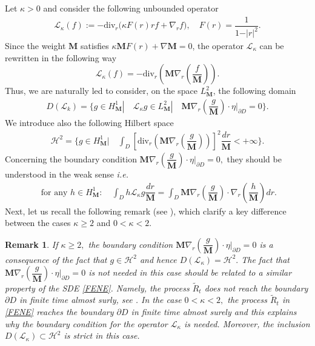 \documentclass[a4paper,12pt, reqno]{amsart}
\newtheorem{remark}[theorem]{Remark}
\newcommand{\M}{\mathbf{M}}
\renewcommand{\k}{\kappa}
\newcommand{\Div}{\text{div}}
\begin{document}
Let $\kappa>0$ and consider the following unbounded operator 
\begin{align}\label{operator-L}
   \mathcal{L}_\kappa(f):= -\Div_r \big(\kappa F(r) rf+	\nabla_r f\big), \quad F(r)=\dfrac{1 }{1-\vert r\vert^2}.
\end{align}
Since the weight $\M$ satisfies $\k \M F(r) + \nabla\M=0 $, the operator $\mathcal{L}_\k$ can be rewritten in the following way
$$\mathcal{L}_\k(f)=-\Div_r\left(\mathbf{M}\nabla_r\left(\dfrac{f}{\mathbf{M}}\right)\right).$$
Thus, we are naturally led to consider, on the space $L^2_\mathbf{M}$, the following domain 
\begin{align}\label{domain-operator-L}
    D(\mathcal{L}_k)=\{ g\in H^1_\mathbf{M} | \quad \mathcal{L}_\kappa g\in L^2_\mathbf{M}| \quad   \mathbf{M}\nabla_r(\dfrac{g}{\mathbf{M}})\cdot \eta\vert_{\partial D}=0\}.
\end{align}
We introduce also the following Hilbert space
\begin{align*}
    \mathcal{H}^2=\{ g\in  H^1_\mathbf{M} | \quad \int_D \left[\Div_r\left(\mathbf{M}\nabla_r\left(\dfrac{g}{\mathbf{M}}\right)\right) \right]^2\dfrac{dr}{\mathbf{M}}<+\infty\}.
\end{align*}
Concerning the boundary condition $\mathbf{M}\nabla_r(\dfrac{g}{\mathbf{M}})\cdot \eta\vert_{\partial D}=0,$ they should be understood in the weak sense \textit{i.e.} 
\begin{align}\label{BC-sense}
\text{ for any } h\in H^1_\mathbf{M}: \quad    \int_D h \mathcal{L}_\kappa g \dfrac{dr}{\mathbf{M}}=\int_D \mathbf{M}\nabla_r(\dfrac{g}{\mathbf{M}})\cdot \nabla_r(\dfrac{h}{\mathbf{M}}) dr.
\end{align}
Next, let us recall the following remark (see \cite[Remark 3.8]{Masmoudi2008}), which clarify  a key difference  between the cases $\kappa\geq 2$ and $0<\kappa<2.$
\begin{remark}\label{rmq-BC-cases}
     If $\kappa\geq 2,$ the boundary condition $\mathbf{M}\nabla_r(\dfrac{g}{\mathbf{M}})\cdot \eta\vert_{\partial D}=0$ is a consequence of the fact that $g\in \mathcal{H}^2$ and hence $D(\mathcal{L}_\kappa)=\mathcal{H}^2.$ The fact that $\mathbf{M}\nabla_r(\dfrac{g}{\mathbf{M}})\cdot \eta\vert_{\partial D}=0$  is not needed in this case should be related to a similar property of the SDE \eqref{FENE}. Namely, the process $\widetilde{R}_t$ does not reach the boundary $\partial D$ in finite time almost surly, see \cite{Jourdain2003mathematical,Jourdain2004existence}.
         In the case  $0<\kappa<2,$ the process $\widetilde{R}_t$  in \eqref{FENE} reaches the boundary $\partial D$ in finite time almost surely and this explains why the boundary condition for the operator $\mathcal{L}_\kappa$ is needed. Moreover, the inclusion $D(\mathcal{L}_\kappa) \subset \mathcal{H}^2$ is strict in this case.
\end{remark}
\end{document}
